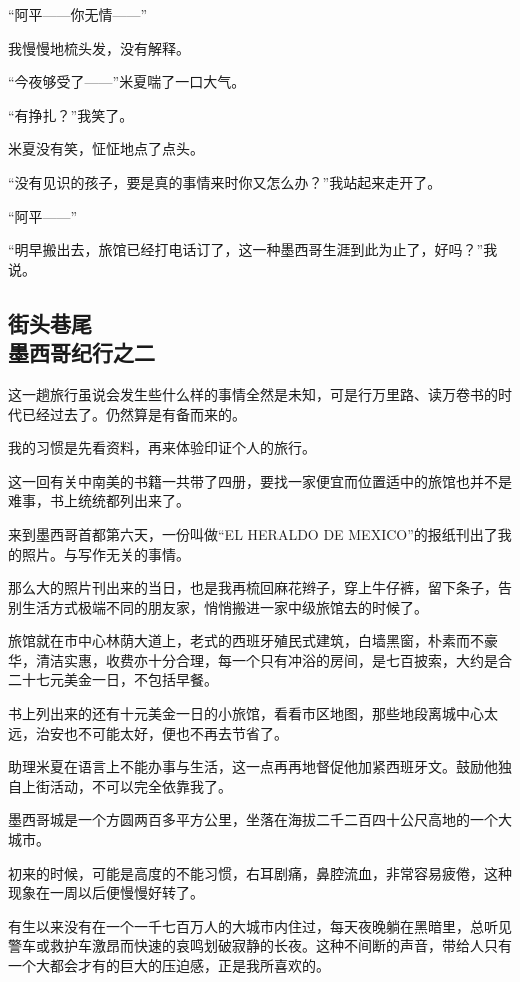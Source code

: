 \par “阿平——你无情——”
\par 我慢慢地梳头发，没有解释。
\par “今夜够受了——”米夏喘了一口大气。
\par “有挣扎？”我笑了。
\par 米夏没有笑，怔怔地点了点头。
\par “没有见识的孩子，要是真的事情来时你又怎么办？”我站起来走开了。
\par “阿平——”
\par “明早搬出去，旅馆已经打电话订了，这一种墨西哥生涯到此为止了，好吗？”我说。
\par 
\par {}

\subsection{街头巷尾\\\small{墨西哥纪行之二}}


\par 这一趟旅行虽说会发生些什么样的事情全然是未知，可是行万里路、读万卷书的时代已经过去了。仍然算是有备而来的。
\par 我的习惯是先看资料，再来体验印证个人的旅行。
\par 这一回有关中南美的书籍一共带了四册，要找一家便宜而位置适中的旅馆也并不是难事，书上统统都列出来了。
\par 来到墨西哥首都第六天，一份叫做“EL HERALDO DE MEXICO”的报纸刊出了我的照片。与写作无关的事情。
\par 那么大的照片刊出来的当日，也是我再梳回麻花辫子，穿上牛仔裤，留下条子，告别生活方式极端不同的朋友家，悄悄搬进一家中级旅馆去的时候了。
\par 旅馆就在市中心林荫大道上，老式的西班牙殖民式建筑，白墙黑窗，朴素而不豪华，清洁实惠，收费亦十分合理，每一个只有冲浴的房间，是七百披索，大约是合二十七元美金一日，不包括早餐。
\par 书上列出来的还有十元美金一日的小旅馆，看看市区地图，那些地段离城中心太远，治安也不可能太好，便也不再去节省了。
\par 助理米夏在语言上不能办事与生活，这一点再再地督促他加紧西班牙文。鼓励他独自上街活动，不可以完全依靠我了。
\par 墨西哥城是一个方圆两百多平方公里，坐落在海拔二千二百四十公尺高地的一个大城市。
\par 初来的时候，可能是高度的不能习惯，右耳剧痛，鼻腔流血，非常容易疲倦，这种现象在一周以后便慢慢好转了。
\par 有生以来没有在一个一千七百万人的大城市内住过，每天夜晚躺在黑暗里，总听见警车或救护车激昂而快速的哀鸣划破寂静的长夜。这种不间断的声音，带给人只有一个大都会才有的巨大的压迫感，正是我所喜欢的。

